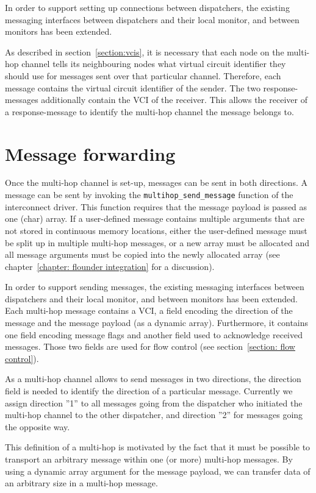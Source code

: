 \documentclass[a4paper,twoside]{report} %
\begin{document}
In order to support setting up connections between dispatchers, the existing messaging interfaces between dispatchers and their local monitor, and between monitors has been extended.

As described in section~\ref{section:vcis}, it is necessary that each node on the multi-hop channel tells its neighbouring nodes what virtual circuit identifier they should use for messages sent over that particular channel. Therefore, each message contains the virtual circuit identifier of the sender.  The two response-messages additionally contain the VCI of the receiver. This allows the receiver of a response-message to identify the multi-hop channel the message belongs to.


\section{Message forwarding}
\label{section: message forwarding}
Once the multi-hop channel is set-up, messages can be sent in both directions. A message can be sent by invoking the \texttt{multihop\_send\_message} function of the interconnect driver.  This function requires that the message payload is passed as one (char) array. If a user-defined message contains multiple arguments that are not stored in continuous memory locations, either the user-defined message must be split up in multiple multi-hop messages, or a new array must be allocated and all message arguments must be copied into the newly allocated array (see chapter~\ref{chapter: flounder integration} for a discussion).

In order to support sending messages, the existing messaging interfaces between dispatchers and their local monitor, and between monitors has been extended. Each multi-hop  message contains a VCI, a field encoding the direction of the message and the message payload (as a dynamic array). Furthermore, it contains one field encoding message flags and another field used to acknowledge received messages. Those two fields are used for flow control (see section~\ref{section: flow control}).

As a multi-hop channel allows to send messages in two directions, the direction field is needed to identify the direction of a particular message. Currently we assign direction ''1'' to all messages going from the dispatcher who initiated the multi-hop channel to the other dispatcher, and direction ''2'' for messages going the opposite way. 

This definition of a multi-hop is motivated by the fact that it must be possible to transport an arbitrary message within one (or more) multi-hop messages. By using a dynamic array argument for the message payload, we can transfer data of an arbitrary size in a multi-hop message.
\end{document}
